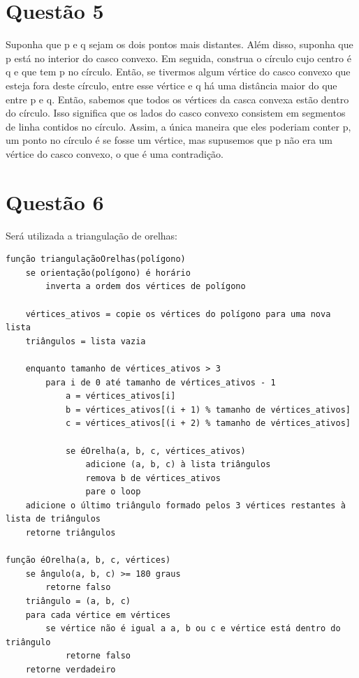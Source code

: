 \documentclass[12pt]{article}
\begin{document}
\section{Questão 5}
\par Suponha que p e q sejam os dois pontos mais distantes. Além disso, suponha que p está no interior do casco convexo. Em seguida, construa o círculo cujo centro é q e que tem p no círculo. Então, se tivermos algum vértice do casco convexo que esteja fora deste círculo, entre esse vértice e q há uma distância maior do que entre p e q. Então, sabemos que todos os vértices da casca convexa estão dentro do círculo. Isso significa que os lados do casco convexo consistem em segmentos de linha contidos no círculo. Assim, a única maneira que eles poderiam conter p, um ponto no círculo é se fosse um vértice, mas supusemos que p não era um vértice do casco convexo, o que é uma contradição.

\section{Questão 6}
\par Será utilizada a triangulação de orelhas:
\begin{verbatim}
função triangulaçãoOrelhas(polígono)
	se orientação(polígono) é horário
		inverta a ordem dos vértices de polígono

	vértices_ativos = copie os vértices do polígono para uma nova lista
	triângulos = lista vazia

	enquanto tamanho de vértices_ativos > 3
		para i de 0 até tamanho de vértices_ativos - 1
			a = vértices_ativos[i]
			b = vértices_ativos[(i + 1) % tamanho de vértices_ativos]
			c = vértices_ativos[(i + 2) % tamanho de vértices_ativos]

            se éOrelha(a, b, c, vértices_ativos)
				adicione (a, b, c) à lista triângulos
				remova b de vértices_ativos
				pare o loop
	adicione o último triângulo formado pelos 3 vértices restantes à lista de triângulos
	retorne triângulos

função éOrelha(a, b, c, vértices)
	se ângulo(a, b, c) >= 180 graus
		retorne falso
	triângulo = (a, b, c)
	para cada vértice em vértices
		se vértice não é igual a a, b ou c e vértice está dentro do triângulo
			retorne falso
	retorne verdadeiro
\end{verbatim}
\end{document}
